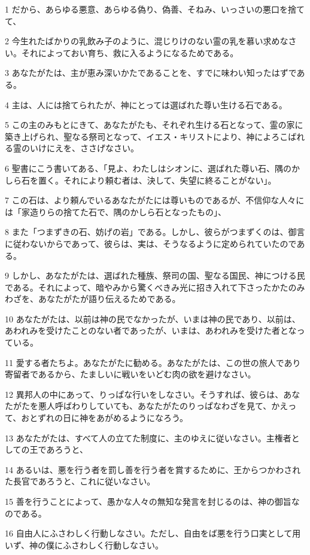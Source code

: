 \par 1 だから、あらゆる悪意、あらゆる偽り、偽善、そねみ、いっさいの悪口を捨てて、
\par 2 今生れたばかりの乳飲み子のように、混じりけのない霊の乳を慕い求めなさい。それによっておい育ち、救に入るようになるためである。
\par 3 あなたがたは、主が恵み深いかたであることを、すでに味わい知ったはずである。
\par 4 主は、人には捨てられたが、神にとっては選ばれた尊い生ける石である。
\par 5 この主のみもとにきて、あなたがたも、それぞれ生ける石となって、霊の家に築き上げられ、聖なる祭司となって、イエス・キリストにより、神によろこばれる霊のいけにえを、ささげなさい。
\par 6 聖書にこう書いてある、「見よ、わたしはシオンに、選ばれた尊い石、隅のかしら石を置く。それにより頼む者は、決して、失望に終ることがない」。
\par 7 この石は、より頼んでいるあなたがたには尊いものであるが、不信仰な人々には「家造りらの捨てた石で、隅のかしら石となったもの」、
\par 8 また「つまずきの石、妨げの岩」である。しかし、彼らがつまずくのは、御言に従わないからであって、彼らは、実は、そうなるように定められていたのである。
\par 9 しかし、あなたがたは、選ばれた種族、祭司の国、聖なる国民、神につける民である。それによって、暗やみから驚くべきみ光に招き入れて下さったかたのみわざを、あなたがたが語り伝えるためである。
\par 10 あなたがたは、以前は神の民でなかったが、いまは神の民であり、以前は、あわれみを受けたことのない者であったが、いまは、あわれみを受けた者となっている。
\par 11 愛する者たちよ。あなたがたに勧める。あなたがたは、この世の旅人であり寄留者であるから、たましいに戦いをいどむ肉の欲を避けなさい。
\par 12 異邦人の中にあって、りっぱな行いをしなさい。そうすれば、彼らは、あなたがたを悪人呼ばわりしていても、あなたがたのりっぱなわざを見て、かえって、おとずれの日に神をあがめるようになろう。
\par 13 あなたがたは、すべて人の立てた制度に、主のゆえに従いなさい。主権者としての王であろうと、
\par 14 あるいは、悪を行う者を罰し善を行う者を賞するために、王からつかわされた長官であろうと、これに従いなさい。
\par 15 善を行うことによって、愚かな人々の無知な発言を封じるのは、神の御旨なのである。
\par 16 自由人にふさわしく行動しなさい。ただし、自由をば悪を行う口実として用いず、神の僕にふさわしく行動しなさい。
